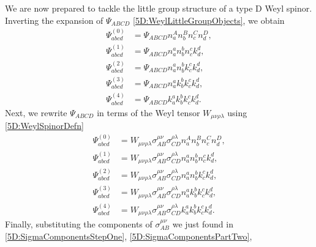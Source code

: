 We are now prepared to tackle the little group structure of a type D Weyl spinor. Inverting the expansion of
$\Psi_{ABCD}$ \eqref{5D:WeylLittleGroupObjects}, we obtain
%
\begin{equation} 
    \begin{split}
        \Psi^{(0)}_{abcd} &= \Psi_{ABCD} n^{A}_{a} n^{B}_{b} n^{C}_{c} n^{D}_{d}, \\
        \Psi^{(1)}_{abcd} &= \Psi_{ABCD} n^{a}_{a} n^{b}_{b} n^{c}_{c} k^{d}_{d}, \\
        \Psi^{(2)}_{abcd} &= \Psi_{ABCD} n^{a}_{a} n^{b}_{b} k^{c}_{c} k^{d}_{d}, \\
        \Psi^{(3)}_{abcd} &= \Psi_{ABCD} n^{a}_{a} k^{b}_{b} k^{c}_{c} k^{d}_{d}, \\
        \Psi^{(4)}_{abcd} &= \Psi_{ABCD} k^{a}_{a} k^{b}_{b} k^{c}_{c} k^{d}_{d}.
    \end{split}
\end{equation}
%
Next, we rewrite $\Psi_{ABCD}$ in terms of the Weyl tensor $W_{\mu \nu \rho \lambda}$ using \eqref{5D:WeylSpinorDefn} 
%
\begin{equation} 
    \begin{split}
        \Psi^{(0)}_{abcd} &= W_{\mu \nu \rho \lambda} \sigma^{\mu \nu}_{AB} \sigma^{\rho \lambda}_{CD} n^{A}_{a} n^{B}_{b} n^{C}_{c} n^{D}_{d}, \\
        \Psi^{(1)}_{abcd} &= W_{\mu \nu \rho \lambda} \sigma^{\mu \nu}_{AB} \sigma^{\rho \lambda}_{CD} n^{a}_{a} n^{b}_{b} n^{c}_{c} k^{d}_{d}, \\
        \Psi^{(2)}_{abcd} &= W_{\mu \nu \rho \lambda} \sigma^{\mu \nu}_{AB} \sigma^{\rho \lambda}_{CD} n^{a}_{a} n^{b}_{b} k^{c}_{c} k^{d}_{d}, \\
        \Psi^{(3)}_{abcd} &= W_{\mu \nu \rho \lambda} \sigma^{\mu \nu}_{AB} \sigma^{\rho \lambda}_{CD} n^{a}_{a} k^{b}_{b} k^{c}_{c} k^{d}_{d}, \\
        \Psi^{(4)}_{abcd} &= W_{\mu \nu \rho \lambda} \sigma^{\mu \nu}_{AB} \sigma^{\rho \lambda}_{CD} k^{a}_{a} k^{b}_{b} k^{c}_{c} k^{d}_{d}.
    \end{split}
\end{equation}
%
Finally, substituting the components of $\sigma^{\mu \nu}_{AB}$ we just found in
\eqref{5D:SigmaComponentsStepOne}, \eqref{5D:SigmaComponentsPartTwo},
